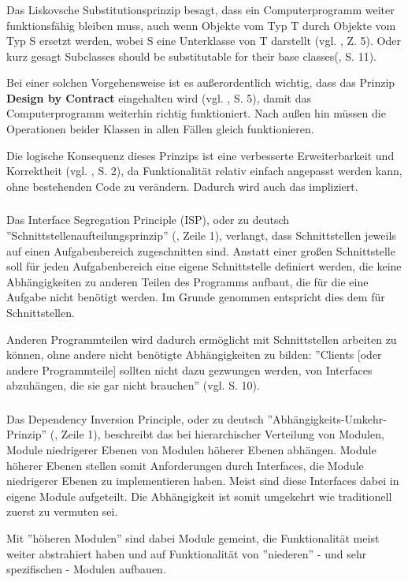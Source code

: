 \subsubsection{\textPrincipleLiskovSubstitution}
\label{\textPrincipleLiskovSubstitution}
Das Liskovsche Substitutionsprinzip besagt, dass ein Computerprogramm weiter funktionsfähig bleiben muss, auch wenn Objekte vom Typ T durch Objekte vom Typ S ersetzt werden, wobei S eine Unterklasse von T darstellt (vgl. \cite{wiki:lsp}, Z. 5). Oder kurz gesagt \glqq Subclasses should be substitutable for their base classes\grqq(\cite{knoernschild2002java}, S. 11).

Bei einer solchen Vorgehensweise ist es außerordentlich wichtig, dass das Prinzip \textbf{Design by Contract} eingehalten wird (vgl. \cite{goll2014architektur}, S. 5), damit das Computerprogramm weiterhin richtig funktioniert. Nach außen hin müssen die Operationen beider Klassen in allen Fällen gleich funktionieren.

Die logische Konsequenz dieses Prinzips ist eine verbesserte Erweiterbarkeit und Korrektheit (vgl. \cite{itDesignersSOLID}, S. 2), da Funktionalität relativ einfach angepasst werden kann, ohne bestehenden Code zu verändern. 
Dadurch wird auch das  impliziert.


\subsubsection{\textPrincipleInterfaceSegregation}
\label{\textPrincipleInterfaceSegregation}
Das Interface Segregation Principle (ISP), oder zu deutsch ''Schnittstellenaufteilungsprinzip'' (\cite{wiki:isp}, Zeile 1), verlangt, dass Schnittstellen jeweils auf einen Aufgabenbereich zugeschnitten sind.
Anstatt einer großen Schnittstelle soll für jeden Aufgabenbereich eine eigene
Schnittstelle definiert werden, die keine Abhängigkeiten zu anderen Teilen des Programms 
aufbaut, die für die eine Aufgabe nicht benötigt werden.
Im Grunde genommen entspricht dies dem   für Schnittstellen.

Anderen Programmteilen wird dadurch ermöglicht mit Schnittstellen arbeiten zu können, ohne andere nicht benötigte Abhängigkeiten zu bilden: ''Clients [oder andere Programmteile] sollten nicht dazu gezwungen werden, von Interfaces abzuhängen, die sie gar nicht brauchen'' (vgl. \cite{goll2014architektur} S. 10).


\subsubsection{\textPrincipleDependencyInversion}
\label{\textPrincipleDependencyInversion}
Das Dependency Inversion Principle, oder zu deutsch ''Abhängigkeits-Umkehr-Prinzip'' (\cite{wiki:dip}, Zeile 1),
beschreibt das bei hierarchischer Verteilung von Modulen, Module niedrigerer Ebenen von Modulen höherer Ebenen abhängen.
Module höherer Ebenen stellen somit Anforderungen durch Interfaces, die Module niedrigerer Ebenen zu implementieren haben.
Meist sind diese Interfaces dabei in eigene Module aufgeteilt. Die Abhängigkeit ist somit umgekehrt wie traditionell
zuerst zu vermuten sei.

Mit ''höheren Modulen'' sind dabei Module gemeint, die Funktionalität meist weiter abstrahiert haben und auf 
Funktionalität von ''niederen'' - und sehr spezifischen - Modulen aufbauen.
